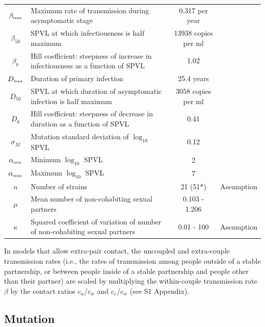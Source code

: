 \documentclass[10pt,letterpaper]{article}
\newcommand{\tsub}[2]{#1_{{\textrm{\tiny #2}}}}
\begin{document}
\begin{table}[h!]
\begin{tabular}{c p{2in} c l}
$\tsub{\beta}{max}$ & Maximum rate of transmission during asymptomatic stage & 0.317 per year & \cite{shirreff_transmission_2011} \\
$\beta_{50}$ & SPVL at which infectiousness is half maximum & 13938 copies per ml & \cite{shirreff_transmission_2011} \\
$\beta_k$ & Hill coefficient: steepness of increase in infectiousness as a function of SPVL & 1.02 & \cite{shirreff_transmission_2011} \\
$\tsub{D}{max}$ & Duration of primary infection & 25.4 years & \cite{shirreff_transmission_2011} \\
$D_{50}$ & SPVL at which duration of asymptomatic infection is half maximum & 3058 copies per ml & \cite{shirreff_transmission_2011} \\
$D_{k}$ & Hill coefficient: steepness of decrease in duration as a function of SPVL & 0.41 & \cite{shirreff_transmission_2011} \\
$\sigma_M$ & Mutation standard deviation of $\log_{10}$ SPVL & 0.12 & \cite{shirreff_transmission_2011} \\
$\tsub{\alpha}{min}$ & Minimum $\log_{10}$ SPVL & 2 & \cite{shirreff_transmission_2011}\\
$\tsub{\alpha}{max}$ & Maximum $\log_{10}$ SPVL & 7 & \cite{shirreff_transmission_2011}\\
$n$ & Number of strains & 21 (51*) & Assumption\\
$\mu$ & Mean number of non-cohabiting sexual partners & 0.103 - 1.206 & \cite{omori2015dynamics}\\
$\kappa$ & Squared coefficient of variation of number of non-cohabiting sexual partners & 0.01 - 100 & Assumption\\
\hline
\end{tabular}
\label{table:parmsTable}
\end{table}

In models that allow extra-pair contact,
the uncoupled and extra-couple transmission rates (i.e., the rates of
transmission among people outside of a stable partnership, or between
people inside of a stable partnership and people other than their
partner) are scaled by
multiplying the within-couple transmission rate $\beta$ by the contact
ratios $c_u/c_w$ and $c_e/c_w$ (see S1 Appendix). 

\subsection*{Mutation}
\end{document}
